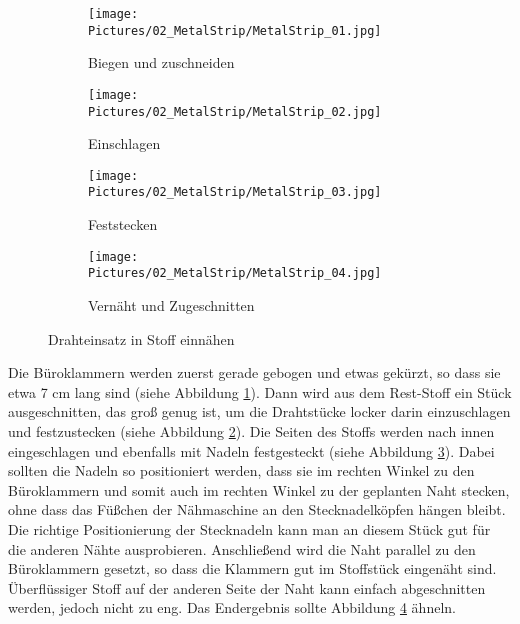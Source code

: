 \documentclass[12pt,parskip=full]{scrartcl}
\begin{document}
\begin{figure}
    \vspace{0.5cm}
    \centering
    \begin{subfigure}{0.48\textwidth}
        \centering
        \texttt{[image: Pictures/02\_MetalStrip/MetalStrip\_01.jpg]}
        \caption{Biegen und zuschneiden}
        \label{MetaStrip1}
    \end{subfigure}
    \begin{subfigure}{0.48\textwidth}
        \centering
        \texttt{[image: Pictures/02\_MetalStrip/MetalStrip\_02.jpg]}
        \caption{Einschlagen}
        \label{MetaStrip2}
    \end{subfigure}
    \begin{subfigure}{0.48\textwidth}
        \centering
        \texttt{[image: Pictures/02\_MetalStrip/MetalStrip\_03.jpg]}
        \caption{Feststecken}
        \label{MetaStrip3}
    \end{subfigure}
    \begin{subfigure}{0.48\textwidth}
        \centering
        \texttt{[image: Pictures/02\_MetalStrip/MetalStrip\_04.jpg]}
        \caption{Vernäht und Zugeschnitten}
        \label{MetaStrip4}
    \end{subfigure}
    \caption{Drahteinsatz in Stoff einnähen}
    \label{MetaStrip}
\end{figure}

Die Büroklammern werden zuerst gerade gebogen und etwas gekürzt, so dass sie etwa 7 cm lang sind (siehe Abbildung \ref{MetaStrip1}). Dann wird aus dem Rest-Stoff ein Stück ausgeschnitten, das groß genug ist, um die Drahtstücke locker darin einzuschlagen und festzustecken (siehe Abbildung \ref{MetaStrip2}). Die Seiten des Stoffs werden nach innen eingeschlagen und ebenfalls mit Nadeln festgesteckt (siehe Abbildung \ref{MetaStrip3}). Dabei sollten die Nadeln so positioniert werden, dass sie im rechten Winkel zu den Büroklammern und somit auch im rechten Winkel zu der geplanten Naht stecken, ohne dass das Füßchen der Nähmaschine an den Stecknadelköpfen hängen bleibt. Die richtige Positionierung der Stecknadeln kann man an diesem Stück gut für die anderen Nähte ausprobieren. Anschließend wird die Naht parallel zu den Büroklammern gesetzt, so dass die Klammern gut im Stoffstück eingenäht sind. Überflüssiger Stoff auf der anderen Seite der Naht kann einfach abgeschnitten werden, jedoch nicht zu eng. Das Endergebnis sollte Abbildung \ref{MetaStrip4} ähneln.
\end{document}
